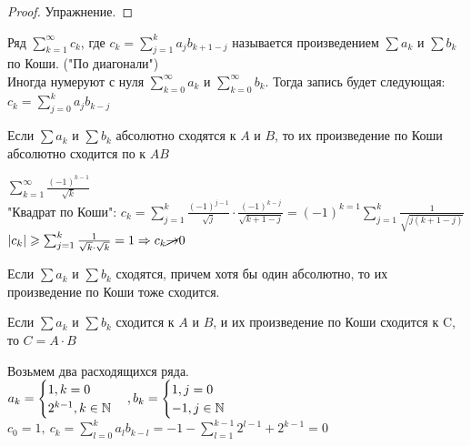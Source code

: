 \begin{proof}
	Упражнение. 
\end{proof}

\begin{Def} 
	Ряд $\sum_{k=1}^{\infty} c_k$, где $c_k = \sum_{j=1}^{k} a_j b_{k+1-j}$ называется 
	произведением $\sum a_k$ и $\sum b_k$ по Коши. ("По диагонали")\\
	Иногда нумеруют с нуля $\sum_{k=0}^{\infty} a_k$ и $\sum_{k=0}^{\infty} b_k$. Тогда запись 
	будет следующая: $c_k = \sum_{j=0}^{k} a_j b_{k-j}$
\end{Def} 

\begin{Cons}
	Если $\sum a_k$ и $\sum b_k$ абсолютно сходятся к $A$ и $B$, то их произведение по Коши 
	абсолютно сходится по к $AB$	
\end{Cons}

\begin{Example}
	$\sum_{k=1}^{\infty} \frac{(-1)^{k-1}}{\sqrt{k}}$\\
	"Квадрат по Коши": $c_k = \sum_{j=1}^{k} \frac{(-1)^{j-1}}{\sqrt{j}} \cdot \frac{(-1)^{k-j}}{\sqrt{k+1-j}} =
	(-1)^{k=1} \sum_{j=1}^{k} \frac{1}{\sqrt{j (k+1-j)}}$\\
	$|c_k| \geqslant \sum_{j=1}^{k} \frac{1}{\sqrt{k} \cdot \sqrt{k}} = 1 \Rightarrow c_k \cancel{\to} 0$
\end{Example}

\begin{Rem}
	Если $\sum a_k$ и $\sum b_k$ сходятся, причем хотя бы один абсолютно, то их произведение по Коши 
	тоже сходится. 
\end{Rem}

\begin{Rem}
	Если $\sum a_k$ и $\sum b_k$ сходится к $A$ и $B$, и их произведение по Коши сходится к C, то 
	$C = A \cdot B$
\end{Rem}

\begin{Example}
	Возьмем два расходящихся ряда.\\
	$a_k = 
	\begin{cases}
		1, k = 0\\
		2^{k-1}, k \in \mathbb{N}
	\end{cases}, b_k = 
	\begin{cases}
		1, j = 0\\
		-1, j \in \mathbb{N} 
	\end{cases}$\\
	$c_0 = 1, \ c_k = \sum_{l=0}^{k} a_l b_{k-l} = -1 - \sum_{l=1}^{k-1} 2^{l-1} + 2^{k-1} = 0$
\end{Example}

